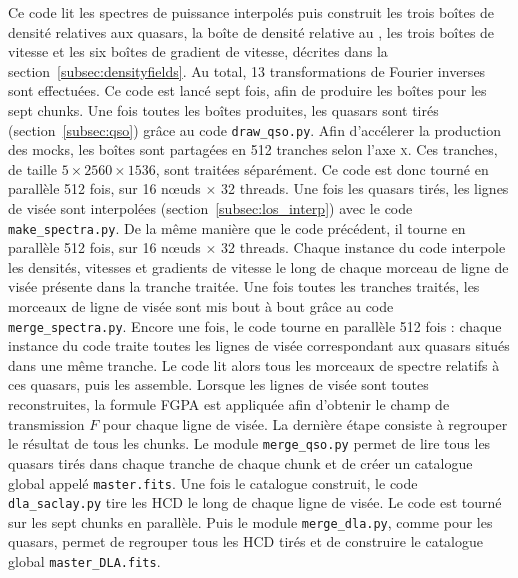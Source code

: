 \documentclass[11pt, twoside, a4paper, openright]{report}
\begin{document}
Ce code lit les spectres de puissance interpolés puis construit les trois boîtes de densité relatives aux quasars, la boîte de densité relative au \lya{}, les trois boîtes de vitesse et les six boîtes de gradient de vitesse, décrites dans la section~\ref{subsec:densityfields}.
Au total, \num{13} transformations de Fourier inverses sont effectuées.
Ce code est lancé sept fois, afin de produire les boîtes pour les sept chunks.
Une fois toutes les boîtes produites, les quasars sont tirés (section~\ref{subsec:qso}) grâce au code \texttt{draw\_qso.py}. Afin d'accélerer la production des mocks, les boîtes sont partagées en \num{512} tranches selon l'axe \textsc{x}. Ces tranches, de taille $\num{5}\times\num{2560}\times\num{1536}$, sont traitées séparément. Ce code est donc tourné en parallèle \num{512} fois, sur 16 n{\oe}uds $\times$ 32 threads.
Une fois les quasars tirés, les lignes de visée sont interpolées (section~\ref{subsec:los_interp}) avec le code \texttt{make\_spectra.py}. De la même manière que le code précédent, il tourne en parallèle \num{512} fois, sur 16 n{\oe}uds $\times$ 32 threads.
Chaque instance du code interpole les densités, vitesses et gradients de vitesse le long de chaque morceau de ligne de visée présente dans la tranche traitée.
Une fois toutes les tranches traités, les morceaux de ligne de visée sont mis bout à bout grâce au code \texttt{merge\_spectra.py}.
Encore une fois, le code tourne en parallèle \num{512} fois : chaque instance du code traite toutes les lignes de visée correspondant aux quasars situés dans une même tranche. Le code lit alors tous les morceaux de spectre relatifs à ces quasars, puis les assemble.
Lorsque les lignes de visée sont toutes reconstruites, la formule FGPA est appliquée afin d'obtenir le champ de transmission $F$ pour chaque ligne de visée.
La dernière étape consiste à regrouper le résultat de tous les chunks. Le module \texttt{merge\_qso.py} permet de lire tous les quasars tirés dans chaque tranche de chaque chunk et de créer un catalogue global appelé \texttt{master.fits}. Une fois le catalogue construit, le code \texttt{dla\_saclay.py} tire les HCD le long de chaque ligne de visée. Le code est tourné sur les sept chunks en parallèle. Puis le module \texttt{merge\_dla.py}, comme pour les quasars, permet de regrouper tous les HCD tirés et de construire le catalogue global \texttt{master\_DLA.fits}.
\end{document}
